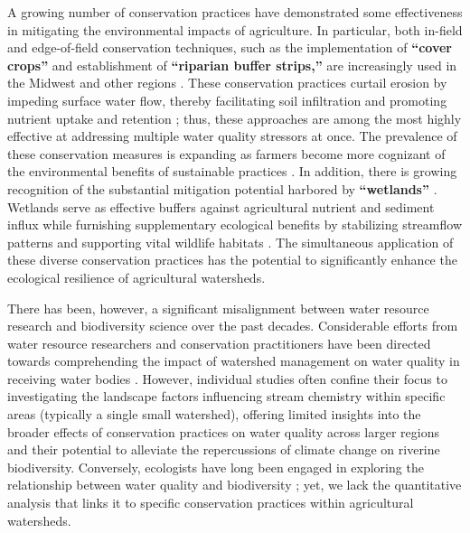\documentclass[12pt, class=article, crop=false]{standalone}
\begin{document}
A growing number of conservation practices have demonstrated some effectiveness in mitigating the environmental impacts of agriculture.
In particular, both in-field and edge-of-field conservation techniques, such as the implementation of \textbf{``cover crops''} and establishment of \textbf{``riparian buffer strips,''} are increasingly used in the Midwest and other regions \citep{us_department_of_agriculture_natural_resources_conservation_service_effects_2017, us_department_of_agriculture_natural_resources_conservation_service_effects_2017-1, wallander_cover_2021}.
These conservation practices curtail erosion by impeding surface water flow, thereby facilitating soil infiltration and promoting nutrient uptake and retention \citep{lenhart_agricultural_2017}; thus, these approaches are among the most highly effective at addressing multiple water quality stressors at once.
The prevalence of these conservation measures is expanding as farmers become more cognizant of the environmental benefits of sustainable practices \citep{wallander_cover_2021}.
In addition, there is growing recognition of the substantial mitigation potential harbored by \textbf{``wetlands''} \citep{hansen_integrated_2021}.
Wetlands serve as effective buffers against agricultural nutrient and sediment influx while furnishing supplementary ecological benefits by stabilizing streamflow patterns and supporting vital wildlife habitats \citep{hansen_contribution_2018, johnston_sediment_1991, mitchell_reducing_2018}.
The simultaneous application of these diverse conservation practices has the potential to significantly enhance the ecological resilience of agricultural watersheds.

There has been, however, a significant misalignment between water resource research and biodiversity science over the past decades.
Considerable efforts from water resource researchers and conservation practitioners have been directed towards comprehending the impact of watershed management on water quality in receiving water bodies \citep{us_environmental_protection_agency_mississippi_2015, basu_managing_2022}.
However, individual studies often confine their focus to investigating the landscape factors influencing stream chemistry within specific areas (typically a single small watershed), offering limited insights into the broader effects of conservation practices on water quality across larger regions and their potential to alleviate the repercussions of climate change on riverine biodiversity.
Conversely, ecologists have long been engaged in exploring the relationship between water quality and biodiversity \citep{piggott_climate_2015, terui_quantifying_2019, hansen_coupling_2016}; yet, we lack the quantitative analysis that links it to specific conservation practices within agricultural watersheds.
\end{document}
